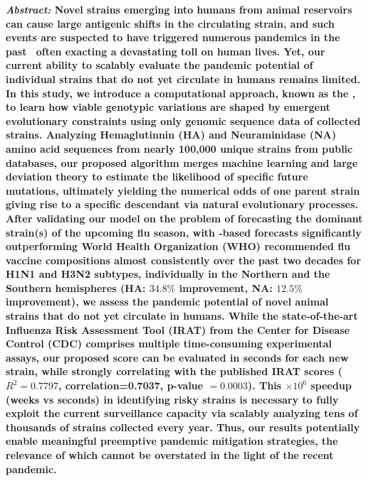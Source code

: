 \documentclass[onecolumn, compsoc,10pt]{IEEEtran}
\begin{document}
  

\maketitle

{\bf \sffamily \fontsize{10}{12}\selectfont \noindent   
  {\normalfont \itshape Abstract:} Novel \infl  strains emerging into humans from animal reservoirs can cause large antigenic shifts in the circulating strain, and such events are suspected to have triggered numerous  pandemics in the past~\cite{shao2017evolution,mills2004transmissibility,reid2003origin,landolt2007up} often exacting a devastating toll on human lives. Yet, our current ability to  scalably  evaluate the pandemic potential of   individual strains that do not yet circulate in humans remains limited. In this study, we introduce a computational approach, known as the \enet,  to learn how viable genotypic variations are shaped by  emergent evolutionary constraints using only genomic sequence data of collected strains.    Analyzing    Hemaglutinnin (HA) and Neuraminidase (NA) amino acid sequences from nearly 100,000 unique \infl  strains from public  databases, our proposed algorithm merges machine learning and large deviation theory to  estimate the likelihood of  specific future  mutations, ultimately  yielding the  numerical odds of one parent strain giving rise to a specific descendant via natural evolutionary processes. After validating our model on the problem of forecasting the dominant strain(s) of the upcoming flu season, with \enet-based forecasts significantly outperforming World Health Organization (WHO) recommended flu vaccine compositions almost consistently over the past two decades for  H1N1 and H3N2 subtypes, individually in the Northern and the Southern hemispheres (HA: $34.8\% $ improvement, NA: $12.5\%$ improvement), we assess  the pandemic potential  of novel animal  strains that do not yet circulate in humans. While the state-of-the-art  Influenza Risk Assessment Tool (IRAT) from the Center for Disease Control (CDC) comprises multiple time-consuming experimental assays, our proposed \erisk score can be evaluated in seconds for each new strain, while strongly correlating with the published IRAT scores ($R^2=0.7797$, correlation=0.7037, p-value $= 0.0003$). This  $\times 10^6$ speedup (weeks vs seconds) in  identifying risky strains is necessary to fully exploit the  current surveillance capacity via scalably analyzing tens of thousands of strains collected every year. Thus, our results potentially  enable  meaningful preemptive pandemic mitigation strategies, the relevance of which cannot be overstated in the light of the recent \hcov pandemic.
}
  
\end{document}
